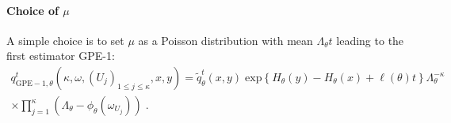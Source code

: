 \documentclass[12pt]{article}
\newcommand{\eqsp}{\;}
\newcommand{\1}{\mathrm{1}}
\begin{document}
\paragraph{Choice of $\mu$}
A simple choice is to set $\mu$ as a Poisson distribution with mean $\Lambda_{\theta}t$ leading to the first estimator GPE-1:
\begin{multline*}
q^{t}_{\mathrm{GPE-1},\theta}(\kappa,\omega,(U_j)_{1\le j\le \kappa},x,y) =  \widetilde{q}^{t}_{\theta}(x,y)\eqsp\mathrm{exp}\left\{H_{\theta}(y) - H_{\theta}(x)+\ell(\theta)t\right\}\Lambda_{\theta}^{-\kappa}\\
\times \prod_{j=1}^{\kappa}\left(\Lambda_{\theta}-\phi_{\theta}(\omega_{U_j})\right)\eqsp.
\end{multline*}
\end{document}

